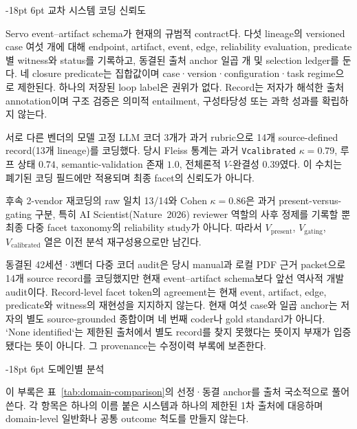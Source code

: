 \documentclass[11pt]{article}
\makeatletter
\renewcommand\section{\@startsection{section}{1}{\z@}%
  {-18pt \@plus -4pt \@minus -2pt}%
  {6pt \@plus 2pt}%
  {\normalfont\large\bfseries}}
\makeatother
\begin{document}
\appendix
\section{교차 시스템 코딩 신뢰도}
\label{app:coding}

Servo event--artifact schema가 현재의 규범적 contract다. 다섯 lineage의 versioned case 여섯 개에 대해 endpoint, artifact, event, edge, reliability evaluation, predicate별 witness와 status를 기록하고, 동결된 출처 anchor 일곱 개 및 selection ledger를 둔다. 네 closure predicate는 집합값이며 case·version·configuration·task regime으로 제한된다. 하나의 저장된 loop label은 권위가 없다. Record는 저자가 해석한 출처 annotation이며 구조 검증은 의미적 entailment, 구성타당성 또는 과학 성과를 확립하지 않는다.

서로 다른 벤더의 모델 고정 LLM 코더 3개가 과거 rubric으로 14개 source-defined record(13개 lineage)를 코딩했다. 당시 Fleiss 통계는 과거 \texttt{Vcalibrated} $\kappa{=}0.79$, 루프 상태 $0.74$, semantic-validation 존재 $1.0$, 전체론적 $V$-완결성 $0.39$였다. 이 수치는 폐기된 코딩 필드에만 적용되며 최종 facet의 신뢰도가 아니다.

후속 2-vendor 재코딩의 raw 일치 13/14와 Cohen $\kappa{=}0.86$은 과거 present-versus-gating 구분, 특히 AI Scientist(Nature~2026) reviewer 역할의 사후 정제를 기록할 뿐 최종 다중 facet taxonomy의 reliability study가 아니다. 따라서 $V_\text{present}$, $V_\text{gating}$, $V_\text{calibrated}$ 열은 이전 분석 재구성용으로만 남긴다.

동결된 42세션·3벤더 다중 코더 audit은 당시 manual과 로컬 PDF 근거 packet으로 14개 source record를 코딩했지만 현재 event--artifact schema보다 앞선 역사적 개발 audit이다. Record-level facet token의 agreement는 현재 event, artifact, edge, predicate와 witness의 재현성을 지지하지 않는다. 현재 여섯 case와 일곱 anchor는 저자의 별도 source-grounded 종합이며 네 번째 coder나 gold standard가 아니다. `None identified`는 제한된 출처에서 별도 record를 찾지 못했다는 뜻이지 부재가 입증됐다는 뜻이 아니다. 그 provenance는 수정이력 부록에 보존한다.

\section{도메인별 분석}
\label{app:domains}

이 부록은 표~\ref{tab:domain-comparison}의 선정·동결 anchor를 출처 국소적으로 풀어 쓴다. 각 항목은 하나의 이름 붙은 시스템과 하나의 제한된 1차 출처에 대응하며 domain-level 일반화나 공통 outcome 척도를 만들지 않는다.
\end{document}
